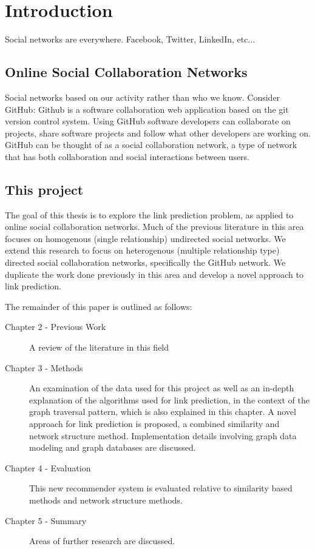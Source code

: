 
\chapter{Introduction}

Social networks are everywhere. Facebook, Twitter, LinkedIn, etc...

\section{Online Social Collaboration Networks}
Social networks based on our activity rather than who we know. Consider GitHub: Github is a software collaboration web application based on the git version control system. Using GitHub software developers can collaborate on projects, share software projects and follow what other developers are working on. GitHub can be thought of as a social collaboration network, a type of network that has both collaboration and social interactions between users. \cite{companion}



\section{This project}
The goal of this thesis is to explore the link prediction problem, as applied to online social collaboration networks. Much of the previous literature in this area focuses on homogenous (single relationship) undirected social networks. We extend this research to focus on heterogenous (multiple relationship type) directed social collaboration networks, specifically the GitHub network. We duplicate the work done previously in this area and develop a novel approach to link prediction.

The remainder of this paper is outlined as follows:

\begin{description}
\item[Chapter 2 - Previous Work ] A review of the literature in this field
\item[Chapter 3 - Methods]  An examination of the data used for this project as well as an in-depth explanation of the algorithms used for link prediction, in the context of the graph traversal pattern, which is also explained in this chapter. A novel approach for link prediction is proposed, a combined similarity and network structure method. Implementation details involving graph data modeling and graph databases are discussed.
\item[Chapter 4 - Evaluation] This new recommender system is evaluated relative to similarity based methods and network structure methods.
\item[Chapter 5 - Summary] Areas of further research are discussed.
\end{description}


